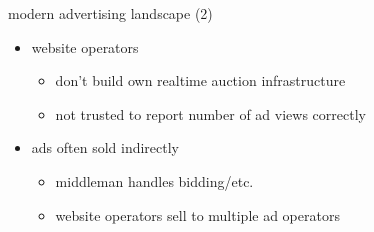 \begin{frame}{modern advertising landscape (2)}
    \begin{itemize}
        \item website operators 
            \begin{itemize}
            \item don't build own realtime auction infrastructure
            \item not trusted to report number of ad views correctly
            \end{itemize}
        \item ads often sold indirectly
            \begin{itemize}
            \item middleman handles bidding/etc.
            \item website operators sell to multiple ad operators
            \end{itemize}
    \end{itemize}
\end{frame}



